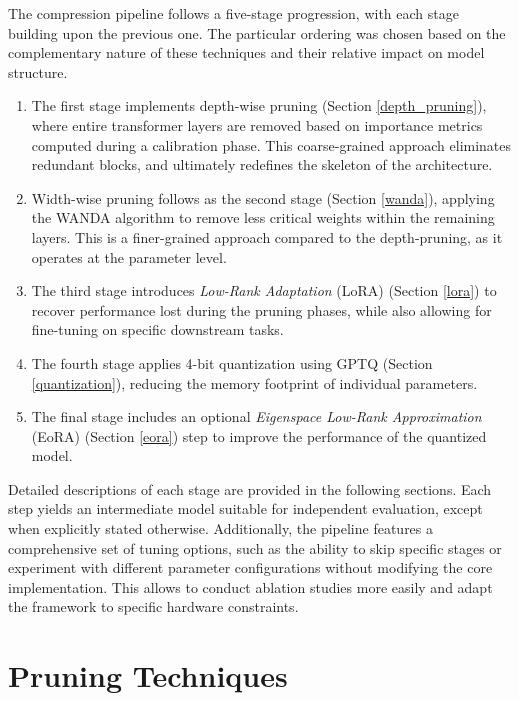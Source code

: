 The compression pipeline follows a five-stage progression, with each stage building upon the previous one. The particular ordering was chosen based on the complementary nature of these techniques and their relative impact on model structure.

\begin{enumerate}
    \item The first stage implements depth-wise pruning (Section \ref{depth_pruning}), where entire transformer layers are removed based on importance metrics computed during a calibration phase. This coarse-grained approach eliminates redundant blocks, and ultimately redefines the skeleton of the architecture.

    \item Width-wise pruning follows as the second stage (Section \ref{wanda}), applying the WANDA algorithm \cite{wanda} to remove less critical weights within the remaining layers. This is a finer-grained approach compared to the depth-pruning, as it operates at the parameter level.

    \item The third stage introduces \textit{Low-Rank Adaptation} (LoRA) \cite{lora} (Section \ref{lora}) to recover performance lost during the pruning phases, while also allowing for fine-tuning on specific downstream tasks.

    \item The fourth stage applies 4-bit quantization using GPTQ \cite{gptq_quantization} (Section \ref{quantization}), reducing the memory footprint of individual parameters.

    \item The final stage includes an optional \textit{Eigenspace Low-Rank Approximation} (EoRA) \cite{eora} (Section \ref{eora}) step to improve the performance of the quantized model.
\end{enumerate}

Detailed descriptions of each stage are provided in the following sections. Each step yields an intermediate model suitable for independent evaluation, except when explicitly stated otherwise. Additionally, the pipeline features a comprehensive set of tuning options, such as the ability to skip specific stages or experiment with different parameter configurations without modifying the core implementation. This allows to conduct ablation studies more easily and adapt the framework to specific hardware constraints.

\section{Pruning Techniques} \label{pruning}

